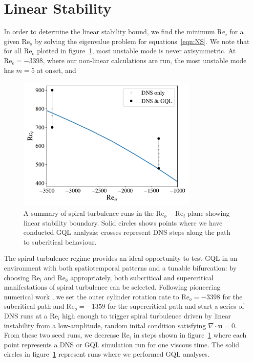 \documentclass[openacc]{rstransa}%
\newcommand{\Reyn}{\mathrm{Re}}
\begin{document}
\section{Linear Stability}
\label{sec:linear}
In order to determine the linear stability bound, we find the minimum $\Reyn_i$ for a given $\Reyn_o$ by solving the eigenvalue problem for equations~\ref{eqn:NS}. We note that for all $\Reyn_o$ plotted in figure~\ref{fig:LSB}, most unstable mode is never axisymmetric. At $\Reyn_o=-3398$, where our non-linear calculations are run, the most unstable mode has $m = 5$ at onset, and 
\begin{figure}
    \centering
    \includegraphics[width=0.8\textwidth]{../figs/reo_rei_lsb.pdf}
    \caption{A summary of spiral turbulence runs in the $\Reyn_o-\Reyn_i$ plane showing linear stability boundary. Solid circles shows points where we have conducted GQL analysis; crosses represent DNS steps along the path to subcritical behaviour. }
    \label{fig:LSB}
\end{figure}

The spiral turbulence regime provides an ideal opportunity to test GQL in an environment with both spatiotemporal patterns and a tunable bifurcation: by choosing $\Reyn_i$ and $\Reyn_o$ appropriately, both subcritical and supercritical manifestations of spiral turbulence can be selected.
Following pioneering numerical work \cite{2009PhRvE..79c6309M, 2009PhRvE..80d6315M}, we set the outer cylinder rotation rate to $\Reyn_o = -3398$ for the subcritical path and $\Reyn_o = -1359$ for the supercritical path and start a series of DNS runs at a $\Reyn_i$ high enough to trigger spiral turbulence driven by linear instability from a low-amplitude, random inital condition satisfying $\nabla \cdot \mathbf{u} = 0$.
From these two seed runs, we decrease $\Reyn_i$ in steps shown in figure~\ref{fig:LSB} where each point represents a DNS or GQL simulation run for one viscous time. The solid circles in figure~\ref{fig:LSB} represent runs where we performed GQL analyses. 
\end{document}
